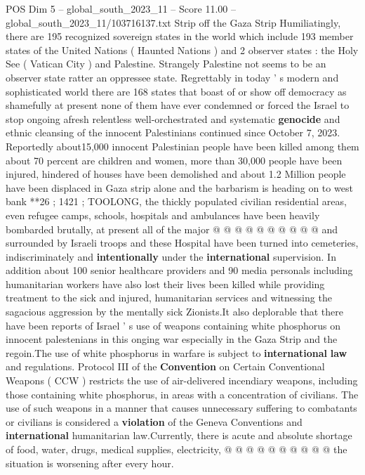 \begin{textsample}{POS Dim 5 – global\_south\_2023\_11 – Score 11.00 – global\_south\_2023\_11/103716137.txt}  \label{ex:f5_pos_260}
Strip off the Gaza Strip Humiliatingly, there are 195 recognized sovereign states in the world which include 193 member states of the United Nations ( Haunted Nations ) and 2 observer states : the Holy See ( Vatican City ) and Palestine.
Strangely Palestine not seems to be an observer state ratter an oppressee state.
Regrettably in today ' s modern and sophisticated world there are 168 states that boast of or show off democracy as shamefully at present none of them have ever condemned or forced the Israel to stop ongoing afresh relentless well-orchestrated and systematic \textbf{genocide} and ethnic cleansing of the innocent Palestinians continued since October 7, 2023.
Reportedly about15,000 innocent Palestinian people have been killed among them about 70 percent are children and women, more than 30,000 people have been injured, hindered of houses have been demolished and about 1.2 Million people have been displaced in Gaza strip alone and the barbarism is heading on to west bank **26 ; 1421 ; TOOLONG, the thickly populated civilian residential areas, even refugee camps, schools, hospitals and ambulances have been heavily bombarded brutally, at present all of the major @ @ @ @ @ @ @ @ @ @ and surrounded by Israeli troops and these Hospital have been turned into cemeteries, indiscriminately and \textbf{intentionally} under the \textbf{international} supervision.
In addition about 100 senior healthcare providers and 90 media personals including humanitarian workers have also lost their lives been killed while providing treatment to the sick and injured, humanitarian services and witnessing the sagacious aggression by the mentally sick Zionists.It also deplorable that there have been reports of Israel ' s use of weapons containing white phosphorus on innocent palestenians in this onging war especially in the Gaza Strip and the regoin.The use of white phosphorus in warfare is subject to \textbf{international} \textbf{law} and regulations.
Protocol III of the \textbf{Convention} on Certain Conventional Weapons ( CCW ) restricts the use of air-delivered incendiary weapons, including those containing white phosphorus, in areas with a concentration of civilians.
The use of such weapons in a manner that causes unnecessary suffering to combatants or civilians is considered a \textbf{violation} of the Geneva Conventions and \textbf{international} humanitarian law.Currently, there is acute and absolute shortage of food, water, drugs, medical supplies, electricity, @ @ @ @ @ @ @ @ @ @ the situation is worsening after every hour.

\end{textsample}
